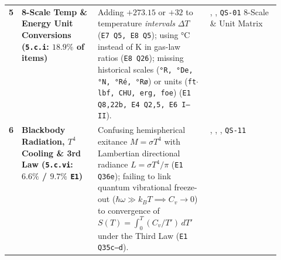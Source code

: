 \begin{table}[h!]
\begin{tabularx}{\linewidth}{@{}l L{0.28\linewidth} X L{0.26\linewidth}@{}}
\textbf{5} & \textbf{8-Scale Temp \& Energy Unit Conversions (\texttt{5.c.i}: $18.9\%$ of items)} & Adding $+273.15$ or $+32$ to temperature \textit{intervals} $\Delta T$ (\texttt{E7 Q5, E8 Q5}); using \si{\celsius} instead of \si{\kelvin} in gas-law ratios (\texttt{E8 Q26}); missing historical scales (\texttt{°R, °De, °N, °Ré, °Rø}) or units (\texttt{ft$\cdot$lbf, CHU, erg, foe}) (\texttt{E1 Q8,22b, E4 Q2,5, E6 I--II}). & , , \texttt{QS-01} 8-Scale \& Unit Matrix \\
\textbf{6} & \textbf{Blackbody Radiation, $T^4$ Cooling \& 3rd Law (\texttt{5.c.vi}: $6.6\%$ / $9.7\%$ \texttt{E1})} & Confusing hemispherical exitance $M = \sigma T^4$ with Lambertian directional radiance $L = \sigma T^4/\pi$ (\texttt{E1 Q36e}); failing to link quantum vibrational freeze-out ($\hbar\omega \gg k_B T \implies C_v \to 0$) to convergence of $S(T) = \int_0^T (C_v/T')\,dT'$ under the Third Law (\texttt{E1 Q35c--d}). & , , , \texttt{QS-11} \\
\bottomrule
\end{tabularx}
\end{table}

